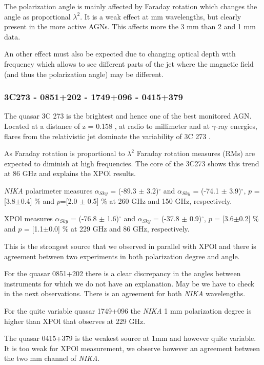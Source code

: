 \documentclass[twocolumn,traditabstract]{aa}
\begin{document}
The polarization angle is mainly affected by Faraday rotation which changes the angle as proportional $\lambda^2$. It is a weak effect at mm wavelengths, but clearly present in the more active AGNs. This affects more the 3 mm than 2 and 1 mm data. 

An other effect must also be expected due to changing optical depth with frequency which allows to see different parts of the jet where the magnetic field (and thus the polarization angle) may be different. 

\subsubsection{3C273 - 0851+202 - 1749+096 - 0415+379}
The quasar 3C 273 is the brightest and hence one of the best monitored AGN. Located at a distance of z = 0.158 \citep{3c273madsen}, at radio to millimeter and at $\gamma$-ray energies, flares from the relativistic jet dominate the variability of 3C 273 \citep{Abdo2010}. 

As Faraday rotation is proportional to $\lambda^2$  \citep{mckee} Faraday rotation measures (RMs) are expected to diminish at high frequencies. The core of the 3C273 shows this trend \citep{Attridge} at 86 GHz and explains the XPOl results. 

{\it NIKA} polarimeter measures {$\alpha_{Sky}$} = (-89.3 $\pm$ 3.2)$^\circ$ and $\alpha_{Sky}$ = (-74.1 $\pm$ 3.9)$^\circ$, $p$ = [3.8$\pm$0.4] $\%$ and $p$=[2.0 $\pm$ 0.5] $\%$ at 260 GHz and 150 GHz, respectively. 

XPOl measures {$\alpha_{Sky}$} = (-76.8 $\pm$ 1.6)$^\circ$  and {$\alpha_{Sky}$} = (-37.8 $\pm$ 0.9)$^\circ$, $p$ = [3.6$\pm$0.2] $\%$ and $p$ = [1.1$\pm$0.0] $\%$ at 229 GHz and 86 GHz, respectively.

This is the strongest source that we observed in parallel with XPOl and there is agreement between two experiments in both polarization degree and angle.

For the quasar 0851+202 there is a clear discrepancy in the angles between instruments for which we do not have an explanation. May be we have to check in the next observations. There is an agreement for both {\it NIKA} wavelengths.

For the quite variable quasar 1749+096 the {\it NIKA} 1 mm polarization degree is higher than XPOl that observes at 229 GHz.

The quasar 0415+379 is the weakest source at 1mm and however quite variable. It is too weak for XPOl measurement, we observe however an agreement between the two mm channel of {\it NIKA}.
\end{document}
